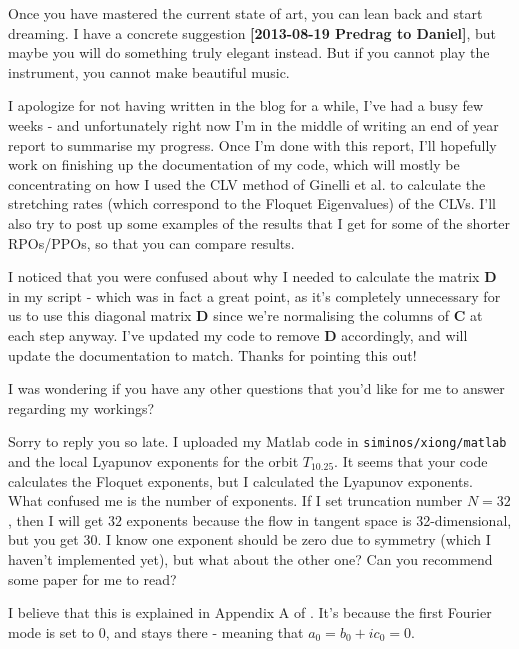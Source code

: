 \begin{description}
Once you have mastered the current state of art, you can lean back and start dreaming. I have a concrete suggestion {\bf [2013-08-19 Predrag to Daniel]}, but maybe you will do something truly elegant instead. But if you cannot play the instrument, you cannot make beautiful music.


\item[2013-09-29 Daniel to Xiong]
I apologize for not having written in the blog for a while, I've had a busy few weeks - and unfortunately right now I'm in the middle of writing an end of year report to summarise my progress. Once I'm done with this report, I'll hopefully work on finishing up the documentation of my code, which will mostly be concentrating on how I used the CLV method of Ginelli et al. to calculate the stretching rates (which correspond to the Floquet Eigenvalues) of the CLVs. I'll also try to post up some examples of the results that I get for some of the shorter RPOs/PPOs, so that you can compare results.

I noticed that you were confused about why I needed to calculate the matrix \textbf{D} in my script - which was in fact a great point, as it's completely unnecessary for us to use this diagonal matrix \textbf{D} since we're normalising the columns of \textbf{C} at each step anyway. I've updated my code to remove \textbf{D} accordingly, and will update the documentation to match. Thanks for pointing this out!

I was wondering if you have any other questions that you'd like for me to answer regarding my workings?

\item[2013-10-05 Xiong to Daniel]
Sorry to reply you so late. I uploaded my Matlab code in \texttt{siminos/xiong/matlab} and the local Lyapunov exponents for the orbit $T_{10.25}$.
It seems that your code calculates the Floquet exponents, but I calculated the Lyapunov exponents. What confused me is the number of exponents.
If I set truncation number $N=32$, then I will get $32$ exponents because the flow in tangent space is 32-dimensional, but you get $30$. I know one exponent should be zero due to symmetry (which I haven't implemented yet), but what about the other one? Can you recommend some paper for
me to read?

\item[2013-10-07 Daniel to Xiong]
I believe that this is explained in Appendix A of . It's because the first Fourier mode is set to 0, and stays there - meaning that $a_0 = b_0 + ic_0 = 0$.


\end{description}
